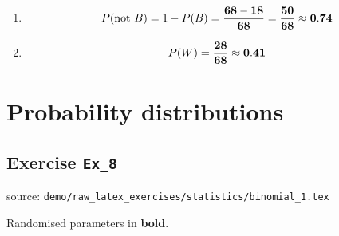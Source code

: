 \documentclass[a4paper, leqno, 12pt]{report}
\newenvironment{top_enumerate}{
\begin{enumerate}
  \setlength{\itemsep}{2em}
  \setlength{\topsep}{-0pt}
  \setlength{\partopsep}{-0pt}
}{\end{enumerate}}
\begin{document}
\begin{top_enumerate}
\begin{enumerate}
	Alternatively, you can also work out the solution using the addition rule. This takes a bit longer and the use of `not' can complicate thinking about this, but the formula still works:
	
	\[
	P(\textrm{not } R \textrm{ or not } B) = P(\textrm{not } R) + P(\textrm{not } B) - P(\textrm{not } R \textrm{ and not } B)
	\]
	
	Rearranging:
	
	\[
	P(\textrm{not } R \textrm{ and not } B) = P(\textrm{not } R) + P(\textrm{not } B) - P(\textrm{not } R \textrm{ or not } B)
	\]
	
	A key aspect is to realise that $P(\textrm{not } R \textrm{ or not } B) = 1$. Any ball you pick is guaranteed to be either `not red' or `not blue'. This is obviously true for the orange and white balls, but also the red and blue ones: a red ball is `not blue' and a blue ball is `not red'! Using this, and replacing $P(\textrm{not } R) = 1 - P(R)$ and $P(\textrm{not } B) = 1 - P(B)$ we get:
	
	\[
	P(\textrm{not } R \textrm{ and not } B) = 1 - P(R) + 1 - P(B) - 1 \; = \; 1 - P(R) - P(B)
	\]
	
	\[
	P(\textrm{not } R \textrm{ and not } B) = \frac{{\bf 68} - {\bf 8} - {\bf 18}}{{\bf 68}} = \frac{{\bf 42}}{{\bf 68}}
	\]
	 \quad \textbf{}
		\item \[
	P(\textrm{not } B) = 1 - P(B) = \frac{{\bf 68} - {\bf 18}}{{\bf 68}} = \frac{{\bf 50}}{{\bf 68}} \approx {\bf 0.74}
	\]
	 \quad \textbf{}
		\item \[
	P(W) = \frac{\bf 28}{\bf 68} \approx {\bf 0.41}
	\]
	 \quad \textbf{}
\end{enumerate}\newpage
\end{top_enumerate}
\section{Probability distributions}
\subsection{Exercise \texttt{Ex\_8}}
source: \texttt{demo/raw\_latex\_exercises/statistics/binomial\_1.tex}

Randomised parameters in \textbf{bold}. 
\end{document}
